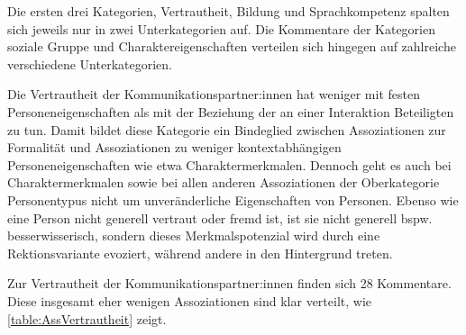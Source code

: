 
Die ersten drei Kategorien, \glqq Vertrautheit\grqq, \glqq Bildung\grqq{} und \glqq Sprachkompetenz\grqq{} spalten sich jeweils nur in zwei Unterkategorien auf. 
Die Kommentare der Kategorien \glqq soziale Gruppe\grqq{} und \glqq Charaktereigenschaften\grqq{} verteilen sich hingegen auf zahlreiche verschiedene Unterkategorien. 

Die Vertrautheit der Kommunikationspartner:innen hat weniger mit festen Personeneigenschaften als mit der Beziehung der an einer Interaktion Beteiligten zu tun. 
Damit bildet diese Kategorie ein Bindeglied zwischen Assoziationen zur Formalität und Assoziationen zu weniger kontextabhängigen Personeneigenschaften wie etwa Charaktermerkmalen. 
Dennoch geht es auch bei Charaktermerkmalen sowie bei allen anderen Assoziationen der Oberkategorie \glqq Personentypus\grqq{} nicht um unveränderliche Eigenschaften von Personen. 
Ebenso wie eine Person nicht generell vertraut oder fremd ist, ist sie nicht generell bspw. besserwisserisch, sondern dieses Merkmalspotenzial wird durch eine Rektionsvariante evoziert, während andere in den Hintergrund treten. 

Zur Vertrautheit der Kommunikationspartner:innen finden sich 28 Kommentare. 
Diese insgesamt eher wenigen Assoziationen sind klar verteilt, wie \autoref{table:AssVertrautheit} zeigt.

